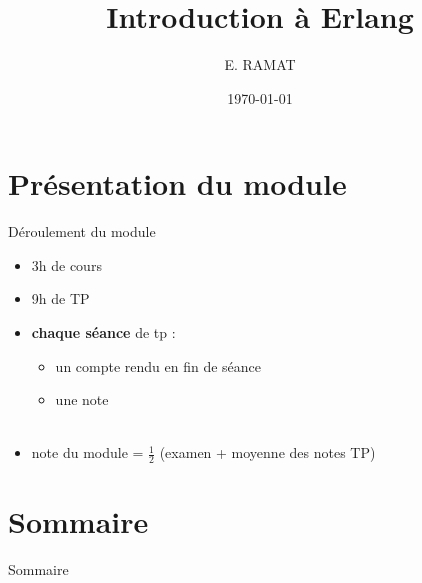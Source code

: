 \documentclass[sans, mathsans, professionalfonts, compress, smaller, table,
               xcolor=pdftex, dvipsnames]{beamer}
\title[Erlang]{Introduction à Erlang}
\subtitle{}
\author[E. Ramat]{E. RAMAT}
\institute[ULCO]{Université du Littoral - Côte d'Opale}
\date{\today}
\begin{document}
\begin{frame}
  \titlepage
\end{frame}

\section*{Présentation du module}
\begin{frame}{Déroulement du module}
  \begin{itemize}
  \item 3h de cours
  \item 9h de TP
  \item \textbf{chaque séance} de tp :
    \begin{itemize}
    \item un compte rendu en fin de séance
    \item une note\\~
    \end{itemize}
  \item note du module = ${\frac{1}{2}}$ (examen + moyenne des notes TP)
  \end{itemize}
\end{frame}

\section*{Sommaire}
\begin{frame}{Sommaire}
\tableofcontents
\end{frame}














\end{document}
